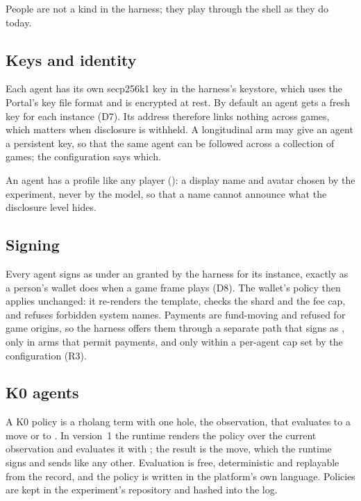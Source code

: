 \documentclass[11pt,a4paper]{article}
\begin{document}
People are not a kind in the harness; they play through the shell as they do today.

\subsection{Keys and identity}

Each agent has its own secp256k1 key in the harness's keystore, which uses the Portal's key file
format and is encrypted at rest. By default an agent gets a fresh key for each instance (D7). Its
address therefore links nothing across games, which matters when disclosure is withheld. A
longitudinal arm may give an agent a persistent key, so that the same agent can be followed across
a collection of games; the configuration says which.

An agent has a profile like any player (): a display name and avatar chosen by
the experiment, never by the model, so that a name cannot announce what the disclosure level hides.

\subsection{Signing}

Every agent signs as  under an  granted by the harness for its
instance, exactly as a person's wallet does when a game frame plays (D8). The wallet's policy then
applies unchanged: it re-renders the template, checks the shard and the fee cap, and refuses
forbidden system names. Payments are fund-moving and refused for game origins, so the harness
offers them through a separate path that signs  as , only
in arms that permit payments, and only within a per-agent cap set by the configuration (R3).

\subsection{K0 agents}\label{sec:k0}

A K0 policy is a rholang term with one hole, the observation, that evaluates to a move or to
. In version~1 the runtime renders the policy over the current observation and evaluates
it with ; the result is the move, which the runtime signs and sends like any
other. Evaluation is free, deterministic and replayable from the record, and the policy is written in
the platform's own language. Policies are kept in the experiment's repository and hashed into the
log.
\end{document}
